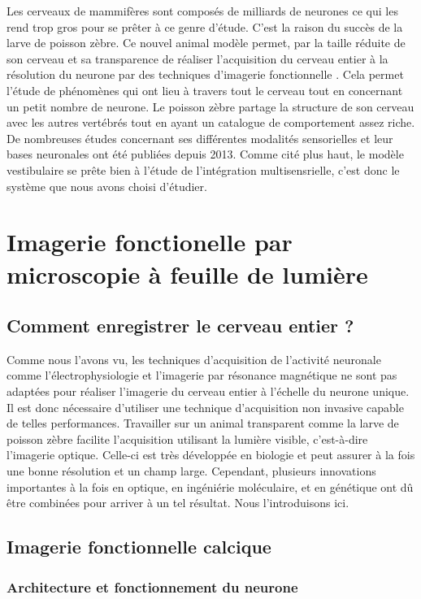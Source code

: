 Les cerveaux de mammifères sont composés de milliards de neurones ce qui les rend trop gros pour se prêter à ce genre d'étude. C'est la raison du succès de la larve de poisson zèbre. Ce nouvel animal modèle permet, par la taille réduite de son cerveau et sa transparence de réaliser l'acquisition du cerveau entier à la résolution du neurone par des techniques d'imagerie fonctionnelle \cite{panier_fast_2013}. Cela permet l'étude de phénomènes qui ont lieu à travers tout le cerveau tout en concernant un petit nombre de neurone. Le poisson zèbre partage la structure de son cerveau avec les autres vertébrés tout en ayant un catalogue de comportement assez riche. De nombreuses études concernant ses différentes modalités sensorielles et leur bases neuronales ont été publiées depuis 2013. Comme cité plus haut, le modèle vestibulaire se prête bien à l'étude de l'intégration multisensrielle, c'est donc le système que nous avons choisi d'étudier.


\section{Imagerie fonctionelle par microscopie à feuille de lumière}

\subsection{Comment enregistrer le cerveau entier ?}

Comme nous l'avons vu, les techniques d'acquisition de l'activité neuronale comme l'électrophysiologie et l'imagerie par résonance magnétique ne sont pas adaptées pour réaliser l'imagerie du cerveau entier à l'échelle du neurone unique. Il est donc nécessaire d'utiliser une technique d'acquisition non invasive capable de telles performances. Travailler sur un animal transparent comme la larve de poisson zèbre facilite l'acquisition utilisant la lumière visible, c'est-à-dire l'imagerie optique. Celle-ci est très développée en biologie et peut assurer à la fois une bonne résolution et un champ large. Cependant, plusieurs innovations importantes à la fois en optique, en ingéniérie moléculaire, et en génétique ont dû être combinées pour arriver à un tel résultat. Nous l'introduisons ici.

\subsection{Imagerie fonctionnelle calcique}

\subsubsection{Architecture et fonctionnement du neurone}

